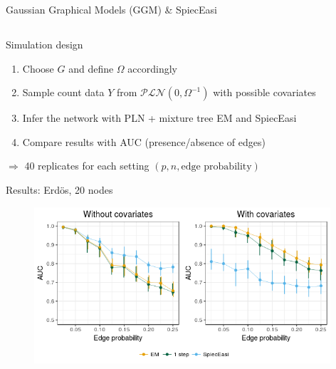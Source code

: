 \documentclass{beamer}
\newcommand{\emphase}[1]{\textcolor{Complement}{#1}}
\begin{document}
\begin{frame}{Gaussian Graphical Models (GGM) \& SpiecEasi}

\end{frame}

\subsection{}

\begin{frame}{Simulation design}

\begin{enumerate}
     \item Choose  \emphase{$G$} and define  \emphase{$\Omega$} accordingly\vspace{0.3cm} 
     \item Sample count data \emphase{$Y$} from $\mathcal{PLN}(0,\Omega^{-1})$ with possible covariates
     \item Infer the network with \emphase{PLN + mixture tree EM}  and \emphase{SpiecEasi} \vspace{0.3cm}
     \item Compare results with \emphase{AUC} (presence/absence of edges)
\end{enumerate}
$\Rightarrow$ 40 replicates for each setting $(p, n, \text{edge probability})$
	
\end{frame}

\begin{frame}{Results: Erdös, 20 nodes}
\begin{figure}[htp]
\centering
\includegraphics[width=11cm]{mosaic.png}
\end{figure}
\end{frame}
\end{document}
